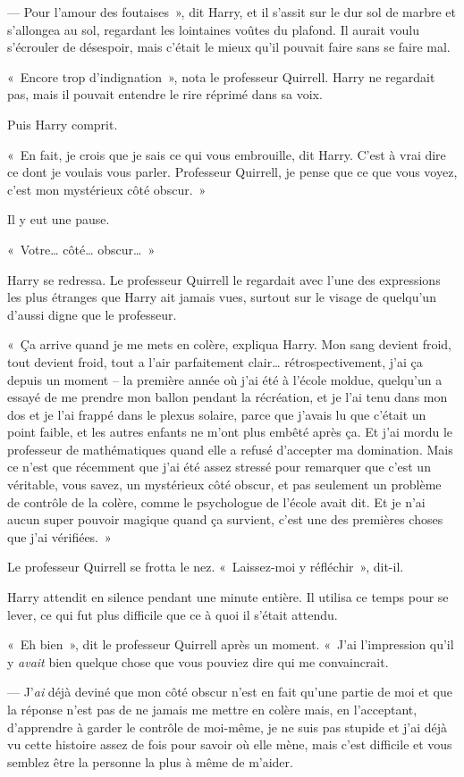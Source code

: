 --- Pour l'amour des foutaises~», dit Harry, et il s'assit sur le dur sol de marbre et s'allongea au sol, regardant les lointaines voûtes du plafond.
Il aurait voulu s'écrouler de désespoir, mais c'était le mieux qu'il pouvait faire sans se faire mal.

«~Encore trop d'indignation~», nota le professeur Quirrell.
Harry ne regardait pas, mais il pouvait entendre le rire réprimé dans sa voix.

Puis Harry comprit.

«~En fait, je crois que je sais ce qui vous embrouille, dit Harry.
C'est à vrai dire ce dont je voulais vous parler.
Professeur Quirrell, je pense que ce que vous voyez, c'est mon mystérieux côté obscur.~»

Il y eut une pause.

«~Votre… côté… obscur…~»

Harry se redressa.
Le professeur Quirrell le regardait avec l'une des expressions les plus étranges que Harry ait jamais vues, surtout sur le visage de quelqu'un d'aussi digne que le professeur.

«~Ça arrive quand je me mets en colère, expliqua Harry.
Mon sang devient froid, tout devient froid, tout a l'air parfaitement clair… rétrospectivement, j'ai ça depuis un moment -- la première année où j'ai été à l'école moldue, quelqu'un a essayé de me prendre mon ballon pendant la récréation, et je l'ai tenu dans mon dos et je l'ai frappé dans le plexus solaire, parce que j'avais lu que c'était un point faible, et les autres enfants ne m'ont plus embêté après ça.
Et j'ai mordu le professeur de mathématiques quand elle a refusé d'accepter ma domination.
Mais ce n'est que récemment que j'ai été assez stressé pour remarquer que c'est un véritable, vous savez, un mystérieux côté obscur, et pas seulement un problème de contrôle de la colère, comme le psychologue de l'école avait dit.
Et je n'ai aucun super pouvoir magique quand ça survient, c'est une des premières choses que j'ai vérifiées.~»

Le professeur Quirrell se frotta le nez.
«~Laissez-moi y réfléchir~», dit-il.

Harry attendit en silence pendant une minute entière.
Il utilisa ce temps pour se lever, ce qui fut plus difficile que ce à quoi il s'était attendu.

«~Eh bien~», dit le professeur Quirrell après un moment.
«~J'ai l'impression qu'il y \emph{avait} bien quelque chose que vous pouviez dire qui me convaincrait.

--- J'\emph{ai} déjà deviné que mon côté obscur n'est en fait qu'une partie de moi et que la réponse n'est pas de ne jamais me mettre en colère mais, en l'acceptant, d'apprendre à garder le contrôle de moi-même, je ne suis pas stupide et j'ai déjà vu cette histoire assez de fois pour savoir où elle mène, mais c'est difficile et vous semblez être la personne la plus à même de m'aider.

